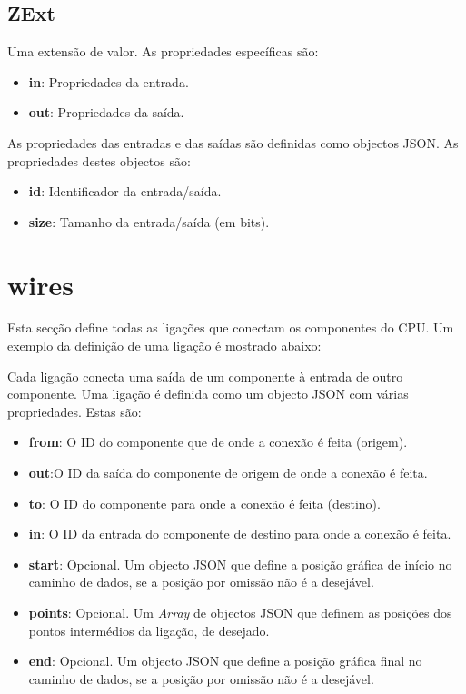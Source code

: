 \documentclass[11pt,a4paper,twoside,titlepage]{report}
\begin{document}
\subsection{ZExt}
Uma extensão de valor. As propriedades específicas são:
\begin{itemize}
	\item \textbf{in}: Propriedades da entrada.
	\item \textbf{out}: Propriedades da saída.
\end{itemize}

As propriedades das entradas e das saídas são definidas como objectos JSON.
As propriedades destes objectos são:
\begin{itemize}
	\item \textbf{id}: Identificador da entrada/saída.
	\item \textbf{size}: Tamanho da entrada/saída (em bits).
\end{itemize}


\section{wires}

Esta secção define todas as ligações que conectam os componentes do CPU.
Um exemplo da definição de uma ligação é mostrado abaixo:



Cada ligação conecta uma saída de um componente à entrada de outro componente.
Uma ligação é definida como um objecto JSON com várias propriedades.
Estas são:

\begin{itemize}
	\item \textbf{from}: O ID do componente que de onde a conexão é feita (origem).
	\item \textbf{out}:O ID da saída do componente de origem de onde a conexão é
		feita.
	\item \textbf{to}: O ID do componente para onde a conexão é feita (destino).
	\item \textbf{in}: O ID da entrada do componente de destino para onde a conexão
		é feita.
	\item \textbf{start}: Opcional. Um objecto JSON que define a posição gráfica
		de início no caminho de dados, se a posição por omissão não é a desejável.
	\item \textbf{points}: Opcional. Um \emph{Array} de objectos JSON que definem
		as posições dos pontos intermédios da ligação, de desejado.
	\item \textbf{end}: Opcional. Um objecto JSON que define a posição gráfica
		final no caminho de dados, se a posição por omissão não é a desejável.
\end{itemize}
\end{document}
